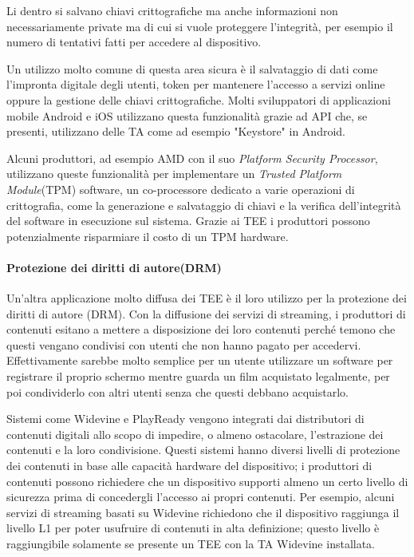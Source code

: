 \documentclass[12pt,italian]{report}
\begin{document}
Li dentro si salvano chiavi crittografiche ma anche informazioni non
necessariamente private ma di cui si vuole proteggere l'integrità, per esempio
il numero di tentativi fatti per accedere al dispositivo.

Un utilizzo molto comune di questa area sicura è il salvataggio di dati
come l'impronta digitale degli utenti, token per mantenere l'accesso a
servizi online oppure la gestione delle chiavi crittografiche.
Molti sviluppatori di applicazioni mobile Android e iOS utilizzano questa
funzionalità grazie ad API che, se presenti, utilizzano delle TA come ad
esempio "Keystore"\cite{androidkeystore} in Android.

Alcuni produttori, ad esempio AMD con il suo
\textit{Platform Security Processor}\cite{amd2020ftpm}, utilizzano queste
funzionalità per implementare un \textit{Trusted Platform Module}(TPM)
software, un co-processore dedicato a varie operazioni di crittografia, come
la generazione e salvataggio di chiavi e la verifica dell'integrità del
software in esecuzione sul sistema.
Grazie ai TEE i produttori possono potenzialmente risparmiare il costo di un
TPM hardware.

\paragraph{Protezione dei diritti di autore(DRM)}

Un'altra applicazione molto diffusa dei TEE è il loro utilizzo per la protezione
dei diritti di autore (DRM). Con la diffusione dei servizi di streaming, i
produttori di contenuti esitano a mettere a disposizione dei loro contenuti
perché temono che questi vengano condivisi con utenti che non hanno pagato
per accedervi.
Effettivamente sarebbe molto semplice per un utente utilizzare un software per
registrare il proprio schermo mentre guarda un film acquistato legalmente, per
poi condividerlo con altri utenti senza che questi debbano acquistarlo.

Sistemi come Widevine\cite{widevine} e PlayReady\cite{playready} vengono
integrati dai distributori di contenuti digitali allo scopo di impedire, o
almeno ostacolare, l'estrazione dei contenuti e la loro condivisione.
Questi sistemi hanno diversi livelli di protezione dei contenuti in base alle
capacità hardware del dispositivo; i produttori di contenuti possono richiedere
che un dispositivo supporti almeno un certo livello di sicurezza prima di
concedergli l'accesso ai propri contenuti.
Per esempio, alcuni servizi di streaming basati su Widevine richiedono che il
dispositivo raggiunga il livello L1 per poter usufruire di contenuti in alta
definizione; questo livello è raggiungibile solamente se presente un TEE con
la TA Widevine installata.
\end{document}
